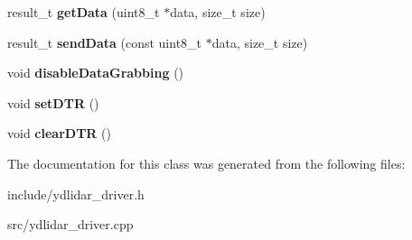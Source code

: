 \begin{DoxyCompactItemize}
\item 
result\+\_\+t {\bfseries get\+Data} (uint8\+\_\+t $\ast$data, size\+\_\+t size)\hypertarget{classydlidar_1_1_y_dlidar_driver_ad787e714bc05e5a70a42b096e632c60f}{}\label{classydlidar_1_1_y_dlidar_driver_ad787e714bc05e5a70a42b096e632c60f}

\item 
result\+\_\+t {\bfseries send\+Data} (const uint8\+\_\+t $\ast$data, size\+\_\+t size)\hypertarget{classydlidar_1_1_y_dlidar_driver_a998ba4b05927d19e8a0d4d29d3d47656}{}\label{classydlidar_1_1_y_dlidar_driver_a998ba4b05927d19e8a0d4d29d3d47656}

\item 
void {\bfseries disable\+Data\+Grabbing} ()\hypertarget{classydlidar_1_1_y_dlidar_driver_ae66565bee3cdb8b74698b691f2ab1e63}{}\label{classydlidar_1_1_y_dlidar_driver_ae66565bee3cdb8b74698b691f2ab1e63}

\item 
void {\bfseries set\+D\+TR} ()\hypertarget{classydlidar_1_1_y_dlidar_driver_a88de43cf13058344fc83389cb9df7e21}{}\label{classydlidar_1_1_y_dlidar_driver_a88de43cf13058344fc83389cb9df7e21}

\item 
void {\bfseries clear\+D\+TR} ()\hypertarget{classydlidar_1_1_y_dlidar_driver_a67fe00d7458cdb52b4160d745b8ecd32}{}\label{classydlidar_1_1_y_dlidar_driver_a67fe00d7458cdb52b4160d745b8ecd32}

\end{DoxyCompactItemize}


The documentation for this class was generated from the following files\+:\begin{DoxyCompactItemize}
\item 
include/ydlidar\+\_\+driver.\+h\item 
src/ydlidar\+\_\+driver.\+cpp\end{DoxyCompactItemize}
